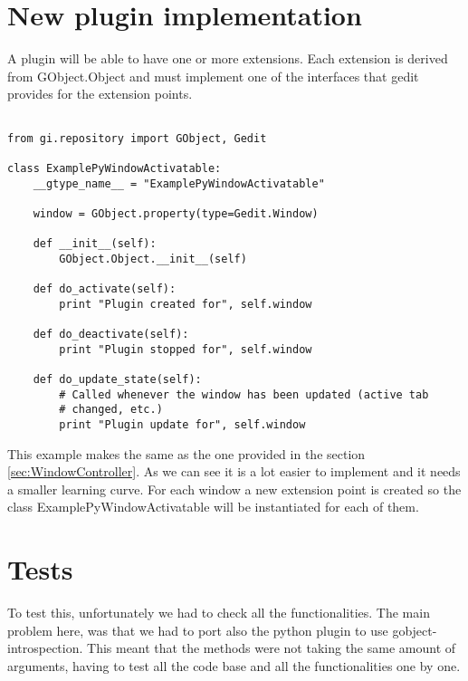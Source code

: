 \section{New plugin implementation}

A plugin will be able to have one or more extensions. Each extension is derived from GObject.Object and must implement one of the interfaces that gedit provides for the extension points.

\begin{lstlisting}[style=python]

from gi.repository import GObject, Gedit

class ExamplePyWindowActivatable:
    __gtype_name__ = "ExamplePyWindowActivatable"

    window = GObject.property(type=Gedit.Window)

    def __init__(self):
        GObject.Object.__init__(self)

    def do_activate(self):
        print "Plugin created for", self.window

    def do_deactivate(self):
        print "Plugin stopped for", self.window

    def do_update_state(self):
        # Called whenever the window has been updated (active tab
        # changed, etc.)
        print "Plugin update for", self.window

\end{lstlisting}

This example makes the same as the one provided in the section \ref{sec:WindowController}. As we can see it is a lot easier to implement and it needs a smaller learning curve. For each window a new extension point is created so the class ExamplePyWindowActivatable will be instantiated for each of them.

\section{Tests}

To test this, unfortunately we had to check all the functionalities. The main problem here, was that we had to port also the python plugin to use gobject-introspection. This meant that the methods were not taking the same amount of arguments, having to test all the code base and all the functionalities one by one.

